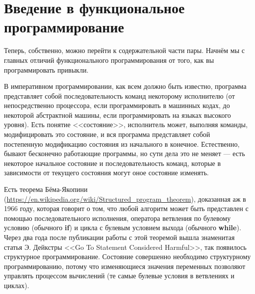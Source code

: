 \documentclass[a5paper]{article}
\begin{document}
\section{Введение в функциональное программирование}

Теперь, собственно, можно перейти к содержательной части пары. Начнём мы с главных отличий функционального программирования от того, как вы программировать привыкли.

В императивном программировании, как всем должно быть известно, программа представляет собой последовательность команд некоторому исполнителю (от непосредственно процессора, если программировать в машинных кодах, до некоторой абстрактной машины, если программировать на языках высокого уровня). Есть понятие <<состояние>>, исполнитель может, выполняя команды, модифицировать это состояние, и вся программа представляет собой постепенную модификацию состояния из начального в конечное. Естественно, бывают бесконечно работающие программы, но сути дела это не меняет --- есть некоторое начальное состояние и последовательность команд, которые в зависимости от текущего состояния могут оное состояние изменять.

Есть теорема Бёма-Якопини (\url{https://en.wikipedia.org/wiki/Structured_program_theorem}), доказанная аж в 1966 году, которая говорит о том, что любой алгоритм может быть представлен с помощью последовательного исполнения, оператора ветвления по булевому условию (обычного \textbf{if}) и цикла с булевым условием выхода (обычного \textbf{while}). Через два года после публикации работы с этой теоремой вышла знаменитая статья Э. Дейкстры <<Go To Statement Considered Harmful>>, так появилось структурное программирование. Состояние совершенно необходимо структурному программированию, потому что изменяющиеся значения переменных позволяют управлять процессом вычислений (те самые булевые условия в ветвлениях и циклах). 
\end{document}
